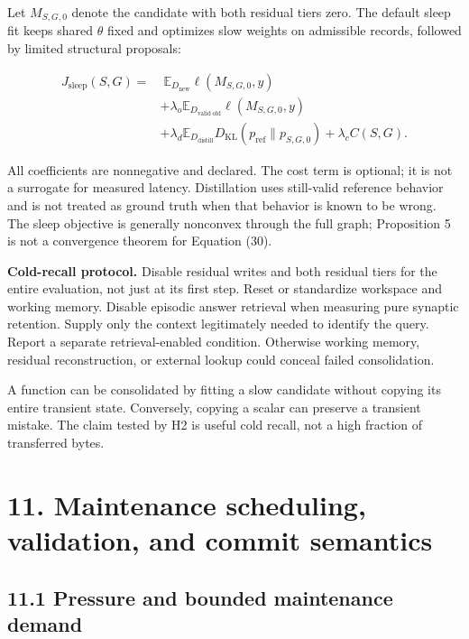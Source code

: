 \documentclass[
  11pt,
  a4paper,
]{article}
\begin{document}
Let \(M_{S,G,0}\) denote the candidate with both residual tiers zero.
The default sleep fit keeps shared \(\theta\) fixed and optimizes slow
weights on admissible records, followed by limited structural proposals:

\[
\begin{aligned}
J_{\mathrm{sleep}}(S,G)=
&\;\mathbb E_{D_{\mathrm{new}}}\ell(M_{S,G,0},y)\\
&+\lambda_o\mathbb E_{D_{\mathrm{valid\ old}}}\ell(M_{S,G,0},y)\\
&+\lambda_d\mathbb E_{D_{\mathrm{distill}}}
D_{\mathrm{KL}}(p_{\mathrm{ref}}\|p_{S,G,0})
+\lambda_c C(S,G).
\end{aligned}
\tag{30}
\]

All coefficients are nonnegative and declared. The cost term is
optional; it is not a surrogate for measured latency. Distillation uses
still-valid reference behavior and is not treated as ground truth when
that behavior is known to be wrong. The sleep objective is generally
nonconvex through the full graph; Proposition 5 is not a convergence
theorem for Equation (30).

\textbf{Cold-recall protocol.} Disable residual writes and both residual
tiers for the entire evaluation, not just at its first step. Reset or
standardize workspace and working memory. Disable episodic answer
retrieval when measuring pure synaptic retention. Supply only the
context legitimately needed to identify the query. Report a separate
retrieval-enabled condition. Otherwise working memory, residual
reconstruction, or external lookup could conceal failed consolidation.

A function can be consolidated by fitting a slow candidate without
copying its entire transient state. Conversely, copying a scalar can
preserve a transient mistake. The claim tested by H2 is useful cold
recall, not a high fraction of transferred bytes.

\section{11. Maintenance scheduling, validation, and commit
semantics}\label{maintenance-scheduling-validation-and-commit-semantics}

\subsection{11.1 Pressure and bounded maintenance
demand}\label{pressure-and-bounded-maintenance-demand}
\end{document}
